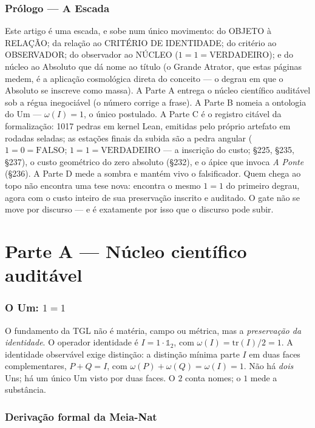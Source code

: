 \documentclass[11pt]{article}
\theoremstyle{definition}\newtheorem{deriv}{Derivação}
\begin{document}
\section*{Prólogo --- A Escada}

\noindent Este artigo é uma escada, e sobe num único movimento: do OBJETO à RELAÇÃO; da relação ao CRITÉRIO DE IDENTIDADE; do critério ao OBSERVADOR; do observador ao NÚCLEO ($1{=}1{=}\mathrm{VERDADEIRO}$); e do núcleo ao Absoluto que dá nome ao título (o Grande Atrator, que estas páginas medem, é a aplicação cosmológica direta do conceito --- o degrau em que o Absoluto se inscreve como massa). A Parte A entrega o núcleo científico auditável sob a régua inegociável (o número corrige a frase). A Parte B nomeia a ontologia do Um --- $\omega(I){=}1$, o único postulado. A Parte C é o registro citável da formalização: 1017 pedras em kernel Lean, emitidas pelo próprio artefato em rodadas seladas; as estações finais da subida são a pedra angular ($1{=}0{=}\mathrm{FALSO}$; $1{=}1{=}\mathrm{VERDADEIRO}$ --- a inscrição do custo; \S225, \S235, \S237), o custo geométrico do zero absoluto (\S232), e o ápice que invoca \emph{A Ponte} (\S236). A Parte D mede a sombra e mantém vivo o falsificador. Quem chega ao topo não encontra uma tese nova: encontra o mesmo $1{=}1$ do primeiro degrau, agora com o custo inteiro de sua preservação inscrito e auditado. O gate não se move por discurso --- e é exatamente por isso que o discurso pode subir.

\part{Parte A --- Núcleo científico auditável}

\section{O Um: $1=1$}

O fundamento da TGL não é matéria, campo ou métrica, mas a \emph{preservação da identidade}. O operador identidade é $I=1\cdot\mathbb{1}_2$, com $\omega(I)=\mathrm{tr}(I)/2=1$. A identidade observável exige distinção: a distinção mínima parte $I$ em duas faces complementares, $P+Q=I$, com $\omega(P)+\omega(Q)=\omega(I)=1$. Não há \emph{dois} Uns; há um único Um visto por duas faces. O $2$ conta nomes; o $1$ mede a substância.

\section{Derivação formal da Meia-Nat}
\end{document}
